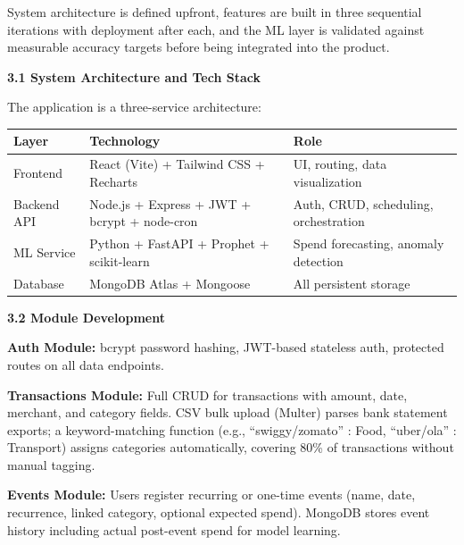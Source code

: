 \documentclass[12pt,a4paper]{article}\ref{}
\newcommand{\subsectiontitle}[1]{%
    \vspace{5pt}
    \textbf{#1}
    \vspace{3pt}
}
\begin{document}
System architecture is defined upfront, features are built in three sequential
iterations with deployment after each, and the ML layer is validated against
measurable accuracy targets before being integrated into the product.

\subsectiontitle{3.1 System Architecture and Tech Stack}

The application is a three-service architecture:

\vspace{5pt}

\begin{center}
\renewcommand{\arraystretch}{1.3}
\begin{tabularx}{\textwidth}{
    >{\raggedright\arraybackslash}p{}
    >{\raggedright\arraybackslash}p{}
    >{\raggedright\arraybackslash}X
}
\toprule
\textbf{Layer} & \textbf{Technology} & \textbf{Role} \\
\midrule

Frontend &
React (Vite) + Tailwind CSS + Recharts &
UI, routing, data visualization \\

Backend API &
Node.js + Express + JWT + bcrypt + node-cron &
Auth, CRUD, scheduling, orchestration \\

ML Service &
Python + FastAPI + Prophet + scikit-learn &
Spend forecasting, anomaly detection \\

Database &
MongoDB Atlas + Mongoose &
All persistent storage \\

\bottomrule
\end{tabularx}
\end{center}

\subsectiontitle{3.2 Module Development}

\textbf{Auth Module:} bcrypt password hashing, JWT-based stateless auth, protected routes
on all data endpoints.

\textbf{Transactions Module:} Full CRUD for transactions with amount, date, merchant, and
category fields. CSV bulk upload (Multer) parses bank statement exports; a
keyword-matching function (e.g., ``swiggy/zomato'' : Food, ``uber/ola'' : Transport)
assigns categories automatically, covering 80\% of transactions without manual tagging.

\textbf{Events Module:} Users register recurring or one-time events (name, date, recurrence,
linked category, optional expected spend). MongoDB stores event history including
actual post-event spend for model learning.
\end{document}
